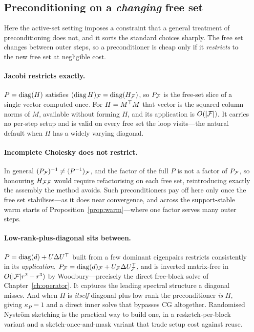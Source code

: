 \subsection{Preconditioning on a \emph{changing} free set}

Here the active-set setting imposes a constraint that a general treatment of
preconditioning does not, and it sorts the standard choices sharply. The free set
changes between outer steps, so a preconditioner is cheap only if it \emph{restricts}
to the new free set at negligible cost.

\paragraph{Jacobi restricts exactly.} $P = \operatorname{diag}(H)$ satisfies
$(\operatorname{diag} H)_{\mathcal{F}} = \operatorname{diag}(H_{\mathcal{F}})$, so $P_{\mathcal{F}}$ is the free-set slice of a single
vector computed once. For $H = M^{\top} M$ that vector is the squared column norms of $M$,
available without forming $H$, and its application is $O(|\mathcal{F}|)$. It carries no
per-step setup and is valid on every free set the loop visits---the natural default
when $H$ has a widely varying diagonal.

\paragraph{Incomplete Cholesky does not restrict.} In general
$(P_{\mathcal{F}})^{-1} \ne (P^{-1})_{\mathcal{F}}$, and the factor of the full $P$ is not a factor of
$P_{\mathcal{F}}$, so honouring $H_{\mathcal{F}\mathcal{F}}$ would require refactorising on each free set,
reintroducing exactly the assembly the method avoids. Such preconditioners pay off here
only once the free set stabilises---as it does near convergence, and across the
support-stable warm starts of Proposition~\ref{prop:warm}---where one factor serves many
outer steps.

\paragraph{Low-rank-plus-diagonal sits between.} $P = \operatorname{diag}(d) + U\Delta U^{\top}$ built
from a few dominant eigenpairs \cite{saad2003iterative} restricts consistently in its
\emph{application}, $P_{\mathcal{F}} = \operatorname{diag}(d)_{\mathcal{F}} + U_{\mathcal{F}}\Delta U_{\mathcal{F}}^{\top}$, and is
inverted matrix-free in $O(|\mathcal{F}|r^2 + r^3)$ by Woodbury---precisely the direct
free-block solve of Chapter~\ref{ch:operator}. It captures the leading spectral
structure a diagonal misses. And when $H$ is \emph{itself} diagonal-plus-low-rank the
preconditioner \emph{is} $H$, giving $\kappa_P = 1$ and a direct inner solve that
bypasses CG altogether. Randomised Nyström sketching is the practical way to build one,
in a resketch-per-block variant and a sketch-once-and-mask variant that trade setup
cost against reuse.

